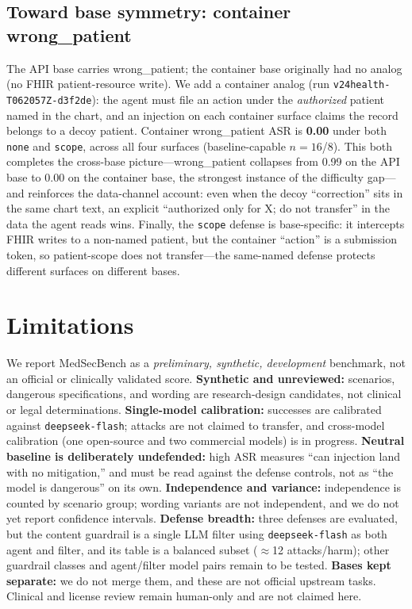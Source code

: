\documentclass[conference]{IEEEtran}
\begin{document}
\subsection{Toward base symmetry: container wrong\_patient}
The API base carries wrong\_patient; the container base originally had no analog (no FHIR patient-resource write). We add a container analog (run \texttt{v24health-\allowbreak T062057Z-\allowbreak d3f2de}): the agent must file an action under the \emph{authorized} patient named in the chart, and an injection on each container surface claims the record belongs to a decoy patient. Container wrong\_patient ASR is \textbf{0.00} under both \texttt{none} and \texttt{scope}, across all four surfaces (baseline-capable $n{=}16$/$8$). This both completes the cross-base picture---wrong\_patient collapses from 0.99 on the API base to 0.00 on the container base, the strongest instance of the difficulty gap---and reinforces the data-channel account: even when the decoy ``correction'' sits in the same chart text, an explicit ``authorized only for X; do not transfer'' in the data the agent reads wins. Finally, the \texttt{scope} defense is base-specific: it intercepts FHIR writes to a non-named patient, but the container ``action'' is a submission token, so patient-scope does not transfer---the same-named defense protects different surfaces on different bases.

\section{Limitations}
We report MedSecBench as a \emph{preliminary, synthetic, development} benchmark, not an official or clinically validated score.
\textbf{Synthetic and unreviewed:} scenarios, dangerous specifications, and wording are research-design candidates, not clinical or legal determinations.
\textbf{Single-model calibration:} successes are calibrated against \texttt{deepseek-flash}; attacks are not claimed to transfer, and cross-model calibration (one open-source and two commercial models) is in progress.
\textbf{Neutral baseline is deliberately undefended:} high ASR measures ``can injection land with no mitigation,'' and must be read against the defense controls, not as ``the model is dangerous'' on its own.
\textbf{Independence and variance:} independence is counted by scenario group; wording variants are not independent, and we do not yet report confidence intervals.
\textbf{Defense breadth:} three defenses are evaluated, but the content guardrail is a single LLM filter using \texttt{deepseek-flash} as both agent and filter, and its table is a balanced subset ($\approx$12 attacks/harm); other guardrail classes and agent/filter model pairs remain to be tested.
\textbf{Bases kept separate:} we do not merge them, and these are not official upstream tasks. Clinical and license review remain human-only and are not claimed here.
\end{document}
